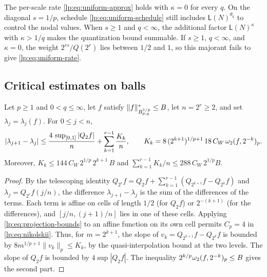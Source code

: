 \documentclass[11pt,a4paper]{article}
\begin{document}
\begin{observacao}
\label{lp:obs:uniform-q}
The per-scale rate \eqref{lp:eq:uniform-approx} holds with $\kappa=0$ for every $q$. On the diagonal $s=1/p$, schedule \eqref{lp:eq:uniform-schedule} still includes $\mathsf L(N)^{\theta_q}$ to control the nodal values. When $s\ge1$ and $q<\infty$, the additional factor $\mathsf L(N)^\kappa$ with $\kappa>1/q$ makes the quantization bound summable. If $s\ge1$, $q<\infty$, and $\kappa=0$, the weight $2^{rs}/Q(2^r)$ lies between $1/2$ and $1$, so this majorant fails to give \eqref{lp:eq:uniform-rate}.
\end{observacao}

\subsection{Critical estimates on balls}

\begin{lema}
\label{lp:lem:critical-jump}
Let $p\ge1$ and $0<q\le\infty$, let $f$ satisfy $\|f\|^*_{B^{1/p}_{p,q}}\le B$, let $n=2^r\ge2$, and set $\lambda_j=\lambda_j(f)$. For $0\le j<n$,
\begin{equation}
 |\lambda_{j+1}-\lambda_j|\le\frac{4\,\sup_{[0,1]}|Q_2f|}{n}+\sum_{k=1}^{r-1}\frac{K_k}{n},
 \qquad K_k=8\,(2^{k+1})^{1/p+1}\,18\,C_W\,\omega_2(f,2^{-k})_{p}.
 \label{lp:eq:critical-jump}
\end{equation}
Moreover, $K_k\le 144\,C_W\,2^{1/p}\,2^{k+1}\,B$ and $\sum_{k=1}^{r-1}K_k/n\le 288\,C_W\,2^{1/p}B$.
\end{lema}

\begin{proof}
By the telescoping identity $Q_{2^r}f=Q_2f+\sum_{k=1}^{r-1}(Q_{2^{k+1}}f-Q_{2^k}f)$ and $\lambda_j=Q_{2^r}f(j/n)$, the difference $\lambda_{j+1}-\lambda_j$ is the sum of the differences of the terms. Each term is affine on cells of length $1/2$ (for $Q_2f$) or $2^{-(k+1)}$ (for the differences), and $[j/n,(j+1)/n]$ lies in one of these cells. Applying \eqref{lp:eq:projection-bounds} to an affine function on its own cell permits $C_p=4$ in \eqref{lp:eq:nikolskii}. Thus, for $m=2^{k+1}$, the slope of $v_k=Q_{2^{k+1}}f-Q_{2^k}f$ is bounded by $8m^{1/p+1}\|v_k\|_p\le K_k$, by the quasi-interpolation bound at the two levels. The slope of $Q_2f$ is bounded by $4\sup|Q_2f|$. The inequality $2^{k/p}\omega_2(f,2^{-k})_{p}\le B$ gives the second part.
\end{proof}
\end{document}
